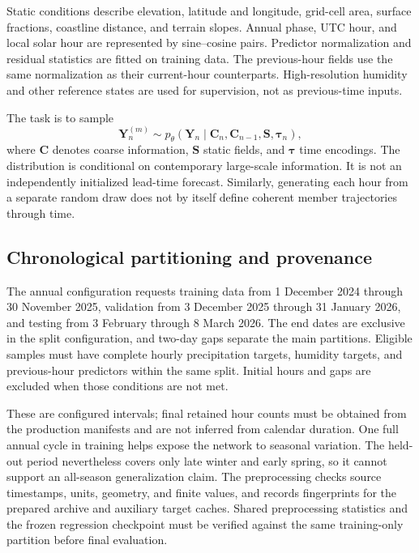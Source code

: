 \documentclass[10pt]{article}
\begin{document}
Static conditions describe elevation, latitude and longitude, grid-cell area, surface fractions, coastline distance, and terrain slopes. Annual phase, UTC hour, and local solar hour are represented by sine--cosine pairs. Predictor normalization and residual statistics are fitted on training data. The previous-hour fields use the same normalization as their current-hour counterparts. High-resolution humidity and other reference states are used for supervision, not as previous-time inputs.

The task is to sample
\begin{equation}
\mathbf{Y}_n^{(m)}\sim p_\theta(\mathbf{Y}_n\mid
\mathbf{C}_n,\mathbf{C}_{n-1},\mathbf{S},\boldsymbol\tau_n),
\label{eq:conditional}
\end{equation}
where $\mathbf{C}$ denotes coarse information, $\mathbf{S}$ static fields, and $\boldsymbol\tau$ time encodings. The distribution is conditional on contemporary large-scale information. It is not an independently initialized lead-time forecast. Similarly, generating each hour from a separate random draw does not by itself define coherent member trajectories through time.

\subsection{Chronological partitioning and provenance}
The annual configuration requests training data from 1 December 2024 through 30 November 2025, validation from 3 December 2025 through 31 January 2026, and testing from 3 February through 8 March 2026. The end dates are exclusive in the split configuration, and two-day gaps separate the main partitions. Eligible samples must have complete hourly precipitation targets, humidity targets, and previous-hour predictors within the same split. Initial hours and gaps are excluded when those conditions are not met.

These are configured intervals; final retained hour counts must be obtained from the production manifests and are not inferred from calendar duration. One full annual cycle in training helps expose the network to seasonal variation. The held-out period nevertheless covers only late winter and early spring, so it cannot support an all-season generalization claim. The preprocessing checks source timestamps, units, geometry, and finite values, and records fingerprints for the prepared archive and auxiliary target caches. Shared preprocessing statistics and the frozen regression checkpoint must be verified against the same training-only partition before final evaluation.
\end{document}
